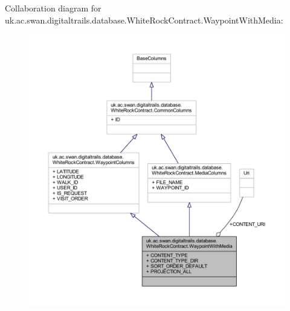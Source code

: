 Collaboration diagram for uk.\+ac.\+swan.\+digitaltrails.\+database.\+White\+Rock\+Contract.\+Waypoint\+With\+Media\+:
\nopagebreak
\begin{figure}[H]
\begin{center}
\leavevmode
\includegraphics[width=350pt]{classuk_1_1ac_1_1swan_1_1digitaltrails_1_1database_1_1_white_rock_contract_1_1_waypoint_with_media__coll__graph}
\end{center}
\end{figure}
